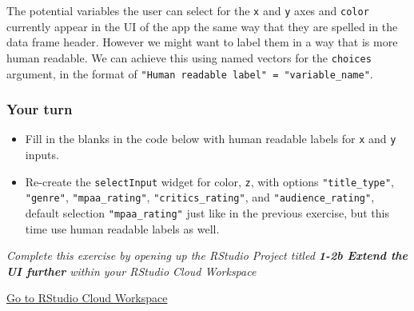 \documentclass[
  letterpaper,
  DIV=11,
  numbers=noendperiod]{scrreprt}
\providecommand{\tightlist}{%
  \setlength{\itemsep}{0pt}\setlength{\parskip}{0pt}}
\begin{document}
The potential variables the user can select for the \texttt{x} and
\texttt{y} axes and \texttt{color} currently appear in the UI of the app
the same way that they are spelled in the data frame header. However we
might want to label them in a way that is more human readable. We can
achieve this using named vectors for the \texttt{choices} argument, in
the format of \texttt{"Human\ readable\ label"\ =\ "variable\_name"}.

\hypertarget{your-turn-2}{%
\subsubsection{Your turn}\label{your-turn-2}}

\begin{itemize}
\tightlist
\item
  Fill in the blanks in the code below with human readable labels for
  \texttt{x} and \texttt{y} inputs.
\item
  Re-create the \texttt{selectInput} widget for color, \texttt{z}, with
  options \texttt{"title\_type"}, \texttt{"genre"},
  \texttt{"mpaa\_rating"}, \texttt{"critics\_rating"}, and
  \texttt{"audience\_rating"}, default selection \texttt{"mpaa\_rating"}
  just like in the previous exercise, but this time use human readable
  labels as well.
\end{itemize}

\emph{Complete this exercise by opening up the RStudio Project titled
\textbf{1-2b Extend the UI further} within your RStudio Cloud Workspace}

\href{https://rstudio.cloud/spaces/81721/join?access_code=I4VJaNsKfTqR3Td9hLP7E1nz8\%2FtMg6Xbw9Bgqumv}{
Go to RStudio Cloud Workspace}
\end{document}
